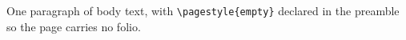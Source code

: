 \documentclass{article}
\begin{document}
One paragraph of body text, with \verb!\pagestyle{empty}! declared in the
preamble so the page carries no folio.
\end{document}

